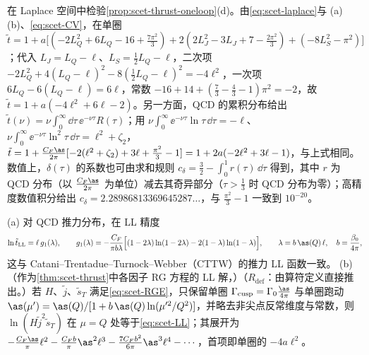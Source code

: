 \begin{example}\label{ex:scet-thrust-oneloop}
在 Laplace 空间中检验\cref{prop:scet-thrust-oneloop}(d)。由\cref{eq:scet-laplace}与 (a)(b)、\cref{eq:scet-CV}，在单圈
$\tilde t=1+a\big[(-2L_Q^2+6L_Q-16+\tfrac{7\pi^2}3)+2(2L_J^2-3L_J+7-\tfrac{2\pi^2}{3})+(-8L_S^2-\pi^2)\big]$；代入 $L_J=L_Q-\ell$、$L_S=\frac12L_Q-\ell$，二次项 $-2L_Q^2+4(L_Q-\ell)^2-8(\frac12L_Q-\ell)^2=-4\ell^2$，一次项 $6L_Q-6(L_Q-\ell)=6\ell$，常数 $-16+14+(\frac73-\frac43-1)\pi^2=-2$，故 $\tilde t=1+a(-4\ell^2+6\ell-2)$。另一方面，QCD 的累积分布给出 $\tilde t(\nu)=\nu\int_0^\infty\dd\tau\,\ee^{-\nu\tau}R(\tau)$；用 $\nu\int_0^\infty\ee^{-\nu\tau}\ln\tau\,\dd\tau=-\ell$、$\nu\int_0^\infty\ee^{-\nu\tau}\ln^2\tau\,\dd\tau=\ell^2+\zeta_2$，
$\tilde t=1+\frac{C_F\as}{2\pi}[-2(\ell^2+\zeta_2)+3\ell+\frac{\pi^2}{3}-1]=1+2a(-2\ell^2+3\ell-1)$，与上式相同。数值上，$\delta(\tau)$ 的系数也可由求和规则 $c_\delta=\frac32-\int_0^1r(\tau)\,\dd\tau$ 得到，其中 $r$ 为 QCD 分布（以 $\frac{C_F\as}{2\pi}$ 为单位）减去其奇异部分（$\tau>\frac13$ 时 QCD 分布为零）；高精度数值积分给出 $c_\delta=2.28986813369645287\ldots$，与 $\frac{\pi^2}{3}-1$ 一致到 $10^{-20}$。%
\end{example}

\begin{proposition}\label{prop:scet-ll}
(a) 对 QCD 推力分布，在 LL 精度
\begin{equation}\label{eq:scet-LL}
\ln\tilde t_{\rm LL}=\ell\,g_1(\lambda),\qquad g_1(\lambda)=-\frac{C_F}{\pi b\lambda}\Big[(1-2\lambda)\ln(1-2\lambda)-2(1-\lambda)\ln(1-\lambda)\Big],\qquad \lambda=b\,\as(Q)\,\ell,\quad b=\frac{\beta_0}{4\pi},
\end{equation}
这与 Catani--Trentadue--Turnock--Webber（CTTW）的推力 LL 函数一致\cite{CataniEtAl1993}。
(b)（作为\cref{thm:scet-thrust}中各因子 RG 方程的 LL 解，\tagR）（$R_{\mathrm{def}}$：由算符定义直接推出。）若 $H$、$\tilde j$、$\tilde s_T$ 满足\cref{eq:scet-RGE}，只保留单圈 $\Gamma_{\rm cusp}=\Gamma_0\frac{\as}{4\pi}$ 与单圈跑动 $\as(\mu')=\as(Q)/[1+b\,\as(Q)\ln(\mu'^2/Q^2)]$，并略去非尖点反常维度与常数，则 $\ln(H\tilde j^2\tilde s_T)$ 在 $\mu=Q$ 处等于\cref{eq:scet-LL}；其展开为 $-\frac{C_F\as}{\pi}\ell^2-\frac{C_Fb}{\pi}\as^2\ell^3-\frac{7C_Fb^2}{6\pi}\as^3\ell^4-\cdots$，首项即单圈的 $-4a\ell^2$。
\end{proposition}

